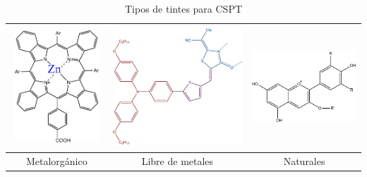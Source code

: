 \begin{table}[h!]
    \centering
    \begin{tabular}{ | c | c | c | }
      \hline
      \begin{minipage}{.3\textwidth}
        \includegraphics[width=35mm, height=42mm]{img/MetalOrganicDye.pdf}
      \end{minipage}
      &
      \begin{minipage}{.3\textwidth}
            \includegraphics[width=\linewidth, height=45mm]{img/dye_scheme.pdf}
      \end{minipage}
      & 
        \begin{minipage}{.3\textwidth}
            \includegraphics[width=40mm, height=35mm]{img/Antocyanin.pdf}
      \end{minipage}
      \\ \hline
      Metalorgánico & Libre de metales & Naturales \\ \hline
    \end{tabular}
    \caption{Tipos de tintes para CSPT}\label{tbl:dyesTypes}
  \end{table}


